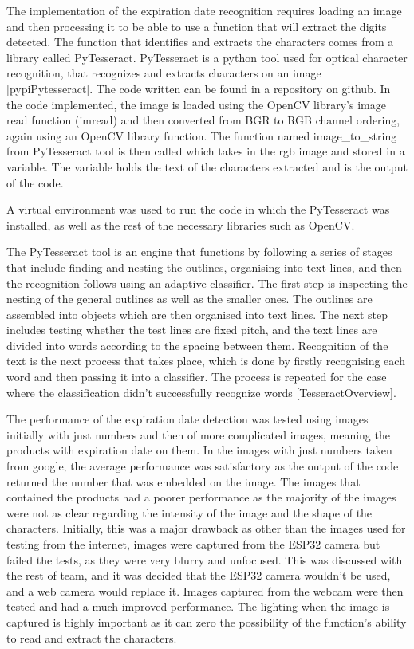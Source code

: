 The implementation of the expiration date recognition requires loading an image and then processing it to be able to use a function that will extract the digits detected.
The function that identifies and extracts the characters comes from a library called PyTesseract.
PyTesseract is a python tool used for optical character recognition, that recognizes and extracts characters on an image [pypiPytesseract].
The code written can be found in a repository on github.
In the code implemented, the image is loaded using the OpenCV library's image read function (imread) and then converted from BGR to RGB channel ordering, again using an OpenCV library function.
The function named image\_to\_string from PyTesseract tool is then called which takes in the rgb image and stored in a variable.
The variable holds the text of the characters extracted and is the output of the code.

A virtual environment was used to run the code in which the PyTesseract was installed, as well as the rest of the necessary libraries such as OpenCV.

The PyTesseract tool is an engine that functions by following a series of stages that include finding and nesting the outlines, organising into text lines, and then the recognition follows using an adaptive classifier.
The first step is inspecting the nesting of the general outlines as well as the smaller ones.
The outlines are assembled into objects which are then organised into text lines.
The next step includes testing whether the test lines are fixed pitch, and the text lines are divided into words according to the spacing between them.
Recognition of the text is the next process that takes place, which is done by firstly recognising each word and then passing it into a classifier.
The process is repeated for the case where the classification didn't successfully recognize words [TesseractOverview].

The performance of the expiration date detection was tested using images initially with just numbers and then of more complicated images, meaning the products with expiration date on them.
In the images with just numbers taken from google, the average performance was satisfactory as the output of the code returned the number that was embedded on the image.
The images that contained the products had a poorer performance as the majority of the images were not as clear regarding the intensity of the image and the shape of the characters.
Initially, this was a major drawback as other than the images used for testing from the internet, images were captured from the ESP32 camera but failed the tests, as they were very blurry and unfocused.
This was discussed with the rest of team, and it was decided that the ESP32 camera wouldn't be used, and a web camera would replace it.
Images captured from the webcam were then tested and had a much-improved performance.
The lighting when the image is captured is highly important as it can zero the possibility of the function's ability to read and extract the characters.

